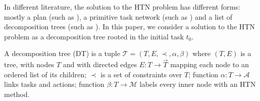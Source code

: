 \documentclass[letterpaper]{article} %
\newtheorem{definition}{Definition}
\newcommand{\Actions}{\mathcal{A}}
\newcommand{\Operators}{\mathcal{O}}
\newcommand{\Cactions}{\mathcal{C}}
\newcommand{\Cname}{\Cactions}
\newcommand{\HtnDomain}{\mathfrak{D}}
\newcommand{\Methods}{\mathcal{M}}
\newcommand{\Method}{\Methods}
\newcommand{\HtnProblem}{\mathcal{P}}
\newcommand{\Lvar}{\mathcal{L}}
\newcommand{\Constraint}{\prec}
\newcommand{\Constraints}{\Constraint}
\newcommand{\ctop}{t_I}
\newcommand{\tn}{\mathsf{tn}}
\newcommand{\Dtree}{\mathcal{T}}
\begin{document}
In different literature, the solution to the HTN problem has different forms: mostly a plan (such as \cite{erol1994htn}), a primitive task network (such as \cite{Behnke2017}) and a list of decomposition trees (such as \cite{DBLP:journals/ai/ZhuoM014}).
In this paper, we consider a solution to the HTN problem as a decomposition tree rooted in the initial task $t_0$.

A decomposition tree (DT) is a tuple $\Dtree = (T,E,\Constraints,\alpha,\beta)$
where
  $(T,E)$ is a tree, with nodes $T$ and with directed edges $E: T \longrightarrow \vec{T}$ mapping each node to an ordered list of its children;
  $\Constraints$ is a set of constraints over $T$;
  function $\alpha: T \longrightarrow \Actions$ links tasks and actions; %
  function $\beta: T \longrightarrow \Method$ labels every inner node with an HTN method. %

\end{document}
